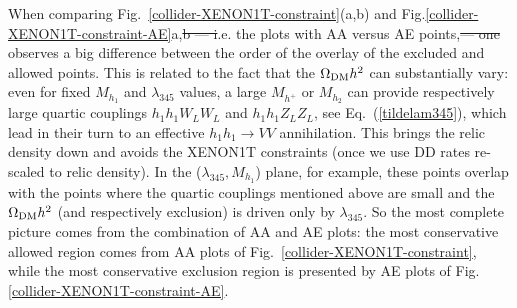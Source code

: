 \documentclass[12pt,a4paper]{article}
\providecommand{\DIFaddtex}[1]{{\protect\color{blue}\uwave{#1}}} %
\providecommand{\DIFdeltex}[1]{{\protect\color{red}\sout{#1}}}                      %
\providecommand{\DIFaddbegin}{} %
\providecommand{\DIFaddend}{} %
\providecommand{\DIFdelbegin}{} %
\providecommand{\DIFdelend}{} %
\providecommand{\DIFadd}[1]{\texorpdfstring{\DIFaddtex{#1}}{#1}} %
\providecommand{\DIFdel}[1]{\texorpdfstring{\DIFdeltex{#1}}{}} %
\begin{document}
When comparing Fig.~\ref{collider-XENON1T-constraint}(a,b) and 
Fig.\ref{collider-XENON1T-constraint-AE}a,\DIFdelbegin \DIFdel{b 
--- i}\DIFdelend \DIFaddbegin \DIFadd{b---i}\DIFaddend .e. the plots with AA versus AE points,\DIFdelbegin \DIFdel{--- one }\DIFdelend \DIFaddbegin \DIFadd{---one }\DIFaddend observes
a big difference between the order of the overlay of the excluded and allowed points.
This is related to the fact that the $\Omega_{\rm DM} h^2$ can substantially vary:
even for  fixed $M_{h_1}$ and  $\lambda_{345}$ values,
a large $M_{h^+}$ or $M_{h_2}$  can provide respectively large quartic couplings $h_1 h_1 W_L W_L$ and  $h_1 h_1 Z_L Z_L$, see Eq.~(\ref{tildelam345}), 
which lead in their turn to an effective $h_1 h_1 \to VV$  annihilation. This brings the relic density down and 
avoids the XENON1T constraints (once we use DD rates re-scaled to relic density).
In the ($\lambda_{345},M_{h_1}$) plane, for example, these points overlap with the points 
where the quartic couplings mentioned above are small and the  $\Omega_{\rm DM} h^2$ (and respectively exclusion) is driven only by $\lambda_{345}$. 
So the most complete picture comes from the combination of AA and AE plots:
the most conservative allowed region comes from AA plots of Fig.~\ref{collider-XENON1T-constraint}, while the most conservative exclusion region
is presented by AE plots of Fig.\ref{collider-XENON1T-constraint-AE}.
\end{document}
